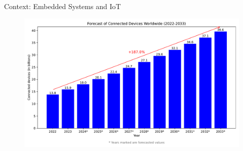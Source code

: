 \begin{frame}{Context: Embedded Systems and IoT}
\begin{minipage}[c]{0.5\textwidth}
\begin{figure}
		\end{figure}
        \vspace{-5pt}
        \begin{figure}
            \centering
            \includegraphics[width=.825\textwidth]{src/1_introduction/img/iot_forecasts.pdf}
            \label{fig:nbr_iot}
        \end{figure}
	\end{minipage}
\end{frame}

